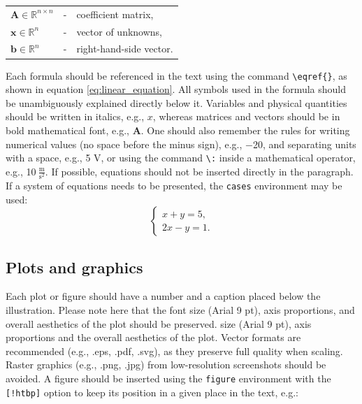 \vspace*{0.5em}
\begin{tabular}{@{}lll}
$\mathbf{A} \in \mathbb{R}^{n\times n}$ &-&coefficient matrix,\\
$\mathbf{x} \in \mathbb{R}^{n}$         &-&vector of unknowns,\\
$\mathbf{b} \in \mathbb{R}^{n}$         &-&right-hand-side vector.
\end{tabular}
\vspace*{0.5em}

\noindent Each formula should be referenced in the text using the command \verb|\eqref{}|, as shown in equation \eqref{eq:linear_equation}. All symbols used in the formula should be unambiguously explained directly below it. Variables and physical quantities should be written in italics, e.g., $x$, whereas matrices and vectors should be in bold mathematical font, e.g., $\mathbf{A}$. One should also remember the rules for writing numerical values (no space before the minus sign), e.g., $-$20, and separating units with a space, e.g., 5 V, or using the command \verb|\:| inside a mathematical operator, e.g., 10$\:  \frac{\mathrm{m}}{\mathrm{s^2}}$. If possible, equations should not be inserted directly in the paragraph. If a system of equations needs to be presented, the \verb|cases| environment may be used:
\begin{equation}
\begin{cases}
x + y = 5,\\
2x - y = 1.
\end{cases}
\label{eq:uklad}
\end{equation}
\enlargethispage{\baselineskip}
\subsection{Plots and graphics}
Each plot or figure should have a number and a caption placed below the illustration. Please note here that the font size (Arial 9 pt), axis proportions, and overall aesthetics of the plot should be preserved. size (Arial 9 pt), axis proportions and the overall aesthetics of the plot. Vector formats are recommended (e.g., .eps, .pdf, .svg), as they preserve full quality when scaling. Raster graphics (e.g., .png, .jpg) from low-resolution screenshots should be avoided. A figure should be inserted using the \verb|figure| environment with the \verb|[!htbp]| option to keep its position in a given place in the text, e.g.:

